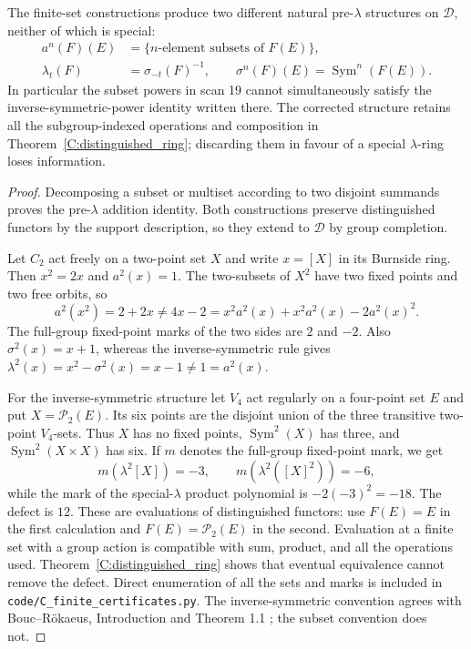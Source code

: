 \begin{proposition}
\label{C:lambda_failure}
The finite-set constructions produce two different natural pre-$\lambda$
structures on $\mathcal D$, neither of which is special:
\[
\begin{aligned}
 a^n(F)(E)&=\{n\text{-element subsets of }F(E)\},\\
 \lambda_t(F)&=\sigma_{-t}(F)^{-1},\qquad
 \sigma^n(F)(E)=\operatorname{Sym}^n(F(E)).
\end{aligned}
\]
In particular the subset powers in scan 19 cannot simultaneously satisfy
the inverse-symmetric-power identity written there. The corrected structure
retains all the subgroup-indexed operations and composition in
Theorem~\ref{C:distinguished_ring}; discarding them in favour of a special
$\lambda$-ring loses information.
\end{proposition}
\begin{proof}
Decomposing a subset or multiset according to two disjoint summands proves
the pre-$\lambda$ addition identity. Both constructions preserve
distinguished functors by the support description, so they extend to
$\mathcal D$ by group completion.

Let $C_2$ act freely on a two-point set $X$ and write $x=[X]$ in its
Burnside ring. Then $x^2=2x$ and $a^2(x)=1$. The two-subsets of $X^2$
have two fixed points and two free orbits, so
\[
 a^2(x^2)=2+2x\ne4x-2
 =x^2a^2(x)+x^2a^2(x)-2a^2(x)^2.
\]
The full-group fixed-point marks of the two sides are $2$ and $-2$.
Also $\sigma^2(x)=x+1$, whereas the inverse-symmetric rule gives
$\lambda^2(x)=x^2-\sigma^2(x)=x-1\ne1=a^2(x)$.

For the inverse-symmetric structure let $V_4$ act regularly on a four-point
set $E$ and put $X=\mathcal P_2(E)$. Its six points are the disjoint union
of the three transitive two-point $V_4$-sets. Thus $X$ has no fixed points,
$\operatorname{Sym}^2(X)$ has three, and
$\operatorname{Sym}^2(X\times X)$ has six. If $m$ denotes the full-group
fixed-point mark, we get
\[
 m(\lambda^2[X])=-3,\qquad
 m(\lambda^2([X]^2))=-6,
\]
while the mark of the special-$\lambda$ product polynomial is
$-2(-3)^2=-18$. The defect is $12$.
These are evaluations of distinguished functors: use $F(E)=E$ in the
first calculation and $F(E)=\mathcal P_2(E)$ in the second. Evaluation at
a finite set with a group action is compatible with sum, product, and all
the operations used. Theorem~\ref{C:distinguished_ring} shows that eventual
equivalence cannot remove the defect. Direct enumeration of all the sets
and marks is included in \texttt{code/C\_finite\_certificates.py}.
The inverse-symmetric convention agrees with Bouc--R\"okaeus,
Introduction and Theorem 1.1 \cite{C-BoucRokaeus2009}; the subset convention
does not.
\end{proof}

